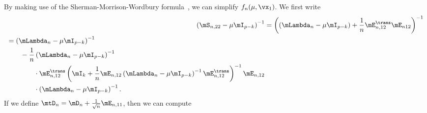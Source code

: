 By making use of the Sherman-Morrison-Wordbury formula~\cite{golub1996mc}, we can simplify $f_n(\mu, \vx_1)$.  We first write
\begin{align*}
    \left(
        \mS_{n,22} - \mu \mI_{p-k}
    \right)^{-1}
        &=
            \left(
                \left(
                    \mLambda_n - \mu \mI_{p-k}
                \right)
                +
                \frac{1}{n}
                \mE_{n,12}^\trans \mE_{n12}
            \right)^{-1} \\
        \begin{split}
        &=
            \left(
                \mLambda_n
                -
                \mu
                \mI_{p-k}
            \right)^{-1} \\
            &\qquad-
            \frac{1}{n}
            \left(
                \mLambda_n
                -
                \mu
                \mI_{p-k}
            \right)^{-1} \\
            &\qquad\qquad\cdot
            \mE_{n,12}^\trans
            \left(
                \mI_k
                +
                \frac{1}{n}
                \mE_{n,12}
                \left(
                    \mLambda_n
                    -
                    \mu
                    \mI_{p-k}
                \right)^{-1}
                \mE_{n,12}^\trans
            \right)^{-1}
            \mE_{n,12} \\
            &\qquad\qquad\cdot
            \left(
                \mLambda_n
                -
                \mu
                \mI_{p-k}
            \right)^{-1}.
    \end{split}
\end{align*}
If we define $\mtD_n = \mD_n + \frac{1}{\sqrt{n}} \mE_{n,11}$, then we can compute
